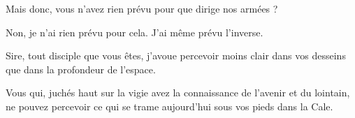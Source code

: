 \begin{drama}
  \alexasspeaks Mais donc, vous n’avez rien prévu pour que \general{} dirige nos armées ?

  \elenaspeaks Non, je n’ai rien prévu pour cela.
               J’ai même prévu l’inverse.

  \alexasspeaks Sire, tout disciple que vous êtes, j’avoue percevoir moins clair dans vos desseins que dans la profondeur de l’espace.

  \elenaspeaks Vous qui, juchés haut sur la vigie avez la connaissance de l’avenir et du lointain, ne pouvez percevoir ce qui se trame aujourd’hui sous vos pieds dans la Cale.
\end{drama}



\scene




\nopagebreak

